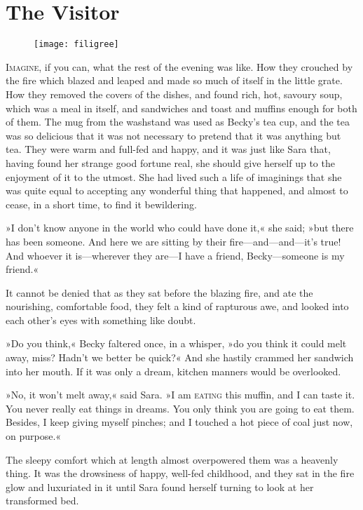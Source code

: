 \chapter{The Visitor}

\begin{figure}[t!]
\centering
\texttt{[image: filigree]}
\end{figure}

\lettrine[lines=5]{I}{magine}, if you can, what the rest of the evening was like. How they crouched by the fire which blazed and leaped and made so much of itself in the little grate. How they removed the covers of the dishes, and found rich, hot, savoury soup, which was a meal in itself, and sandwiches and toast and muffins enough for both of them. The mug from the washstand was used as Becky's tea cup, and the tea was so delicious that it was not necessary to pretend that it was anything but tea. They were warm and full-fed and happy, and it was just like Sara that, having found her strange good fortune real, she should give herself up to the enjoyment of it to the utmost. She had lived such a life of imaginings that she was quite equal to accepting any wonderful thing that happened, and almost to cease, in a short time, to find it bewildering.

»I don't know anyone in the world who could have done it,« she said; »but there has been someone. And here we are sitting by their fire—and—and—it's true! And whoever it is—wherever they are—I have a friend, Becky—someone is my friend.«

It cannot be denied that as they sat before the blazing fire, and ate the nourishing, comfortable food, they felt a kind of rapturous awe, and looked into each other's eyes with something like doubt.

»Do you think,« Becky faltered once, in a whisper, »do you think it could melt away, miss? Hadn't we better be quick?« And she hastily crammed her sandwich into her mouth. If it was only a dream, kitchen manners would be overlooked.

»No, it won't melt away,« said Sara. »I am \textsc{eating} this muffin, and I can taste it. You never really eat things in dreams. You only think you are going to eat them. Besides, I keep giving myself pinches; and I touched a hot piece of coal just now, on purpose.«

The sleepy comfort which at length almost overpowered them was a heavenly thing. It was the drowsiness of happy, well-fed childhood, and they sat in the fire glow and luxuriated in it until Sara found herself turning to look at her transformed bed.

